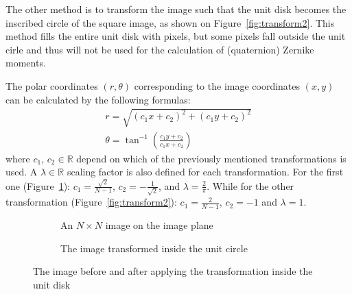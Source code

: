 The other method is to transform the image such that the unit disk becomes the inscribed circle of the square image, as shown on Figure~\ref{fig:transform2}. This method fills the entire unit disk with pixels, but some pixels fall outside the unit cirle and thus will not be used for the calculation of (quaternion) Zernike moments.

The polar coordinates $(r,\theta)$ corresponding to the image coordinates $(x,y)$ can be calculated by the following formulas:
\begin{gather*}
  r = \sqrt{(c_1x + c_2)^2 + (c_1y + c_2)^2} \\
  \theta = \tan^{-1}\left(\frac{c_1y + c_2}{c_1x + c_2}\right)
\end{gather*}
where $c_1$, $c_2 \in \mathds{R}$ depend on which of the previously mentioned transformations is used. A $\lambda \in \mathds{R}$ scaling factor is also defined for each transformation.
For the first one (Figure~\ref{fig:transform1}): $c_1 = \frac{\sqrt{2}}{N - 1}$, $c_2 = -\frac{1}{\sqrt{2}}$, and $\lambda = \frac{2}{\pi}$. While for the other transformation (Figure~\ref{fig:transform2}): $c_1 = \frac{2}{N - 1}$, $c_2 = -1$ and $\lambda = 1$.

\begin{figure}[tb]
  \begin{subfigure}{.43\textwidth}
  \centering
  \caption{An $N \times N$ image on the image plane}
  \end{subfigure}
  \begin{subfigure}{.05\textwidth}
    \centering
  \end{subfigure}
  \begin{subfigure}{.50\textwidth}
    \centering
    \caption{The image transformed inside the unit circle}
    \end{subfigure}
  \caption{The image before and after applying the transformation inside the unit disk}
  \label{fig:transform1}
\end{figure}

